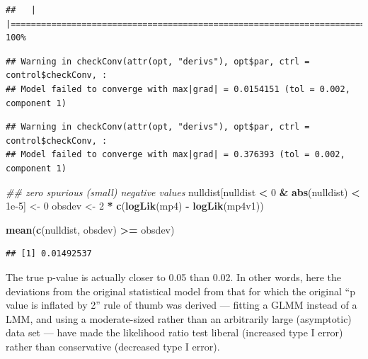 \documentclass[
  12pt,
]{book}
\newenvironment{Shaded}{\begin{snugshade}}{\end{snugshade}}
\newcommand{\CommentTok}[1]{\textcolor[rgb]{0.56,0.35,0.01}{\textit{#1}}}
\newcommand{\DecValTok}[1]{\textcolor[rgb]{0.00,0.00,0.81}{#1}}
\newcommand{\FloatTok}[1]{\textcolor[rgb]{0.00,0.00,0.81}{#1}}
\newcommand{\KeywordTok}[1]{\textcolor[rgb]{0.13,0.29,0.53}{\textbf{#1}}}
\newcommand{\NormalTok}[1]{#1}
\newcommand{\OperatorTok}[1]{\textcolor[rgb]{0.81,0.36,0.00}{\textbf{#1}}}
\newcommand{\StringTok}[1]{\textcolor[rgb]{0.31,0.60,0.02}{#1}}
\begin{document}
\begin{verbatim}
##   |                                                                              |======================================================================| 100%
\end{verbatim}

\begin{verbatim}
## Warning in checkConv(attr(opt, "derivs"), opt$par, ctrl = control$checkConv, :
## Model failed to converge with max|grad| = 0.0154151 (tol = 0.002, component 1)
\end{verbatim}

\begin{verbatim}
## Warning in checkConv(attr(opt, "derivs"), opt$par, ctrl = control$checkConv, :
## Model failed to converge with max|grad| = 0.376393 (tol = 0.002, component 1)
\end{verbatim}

\begin{Shaded}
\begin{Highlighting}[]
\CommentTok{## zero spurious (small) negative values}
\NormalTok{nulldist[nulldist }\OperatorTok{<}\StringTok{ }\DecValTok{0} \OperatorTok{&}\StringTok{ }\KeywordTok{abs}\NormalTok{(nulldist) }\OperatorTok{<}\StringTok{ }\FloatTok{1e-5}\NormalTok{] <-}\StringTok{ }\DecValTok{0}
\NormalTok{obsdev <-}\StringTok{ }\DecValTok{2} \OperatorTok{*}\StringTok{ }\KeywordTok{c}\NormalTok{(}\KeywordTok{logLik}\NormalTok{(mp4) }\OperatorTok{-}\StringTok{ }\KeywordTok{logLik}\NormalTok{(mp4v1))}
\end{Highlighting}
\end{Shaded}

\begin{Shaded}
\begin{Highlighting}[]
\KeywordTok{mean}\NormalTok{(}\KeywordTok{c}\NormalTok{(nulldist, obsdev) }\OperatorTok{>=}\StringTok{ }\NormalTok{obsdev)}
\end{Highlighting}
\end{Shaded}

\begin{verbatim}
## [1] 0.01492537
\end{verbatim}

The true p-value is actually closer to 0.05 than 0.02. In other words, here the deviations from the original statistical model from that for which the original ``p value is inflated by 2'' rule of thumb was derived --- fitting a GLMM instead of a LMM, and using a moderate-sized rather than an arbitrarily large (asymptotic) data set --- have made the likelihood ratio test liberal (increased type I error) rather than conservative (decreased type I error).
\end{document}
